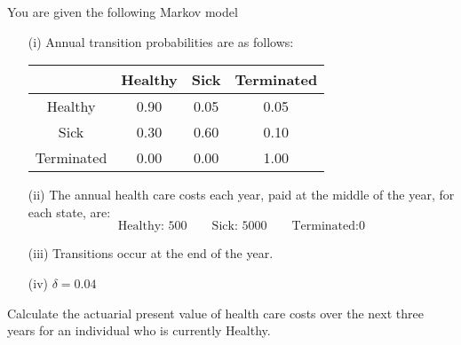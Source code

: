You are given the following Markov model
\begin{itemize}
\item[(i)] Annual transition probabilities are as follows:
\begin{center}\begin{tabular}{c|ccc} & Healthy & Sick & Terminated \\ \hline
   Healthy & 0.90 & 0.05 & 0.05 \\ Sick & 0.30 & 0.60 & 0.10 \\ Terminated & 0.00 & 0.00 & 1.00 \end{tabular}\end{center}
\item[(ii)] The annual health care costs each year, paid at the middle of the year, for each state, are:
\[ \text{Healthy: }500 \qquad\text{Sick: } 5000 \qquad\text{Terminated:} 0 \]
\item[(iii)] Transitions occur at the end of the year.
\item[(iv)] $\delta=0.04$
\end{itemize}
Calculate the actuarial present value of health care costs over the next three years for an individual who is currently Healthy.


